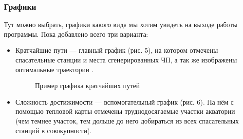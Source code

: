 \documentclass{article}
\begin{document}
    \subsubsection{Графики} 
    Тут можно выбрать, графики какого вида мы хотим увидеть на выходе работы программы. Пока добавлено всего три варианта: 
    \begin{itemize}
        \item Кратчайшие пути --- главный график (рис. 5), на котором отмечены спасательные станции и места сгенерированных ЧП, а так же изображены оптимальные траектории .
        \begin{figure}[hbt!]
            \begin{minipage}[h]{\linewidth}
            \end{minipage}
            \caption{Пример графика кратчайших путей}
        \end{figure}
        \item Сложность достижимости --- вспомогательный график (рис. 6). На нём с помощью тепловой карты отмечены труднодосягаемые участки акватории (чем темнее участок, тем дольше до него добираться из всех спасательных станций в совокупности). 
        \begin{figure}[hbt!]
            \begin{minipage}[h]{\linewidth}

\end{minipage}
\end{figure}
\end{itemize}
\end{document}
